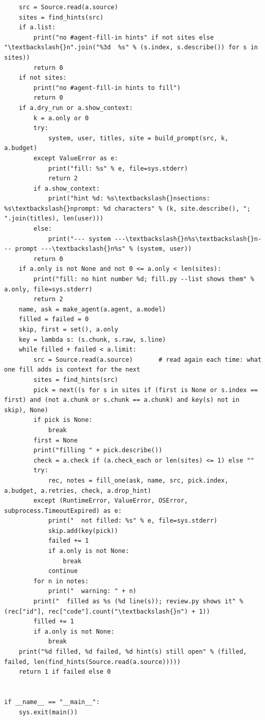 \documentclass[10pt,a4paper]{article}
\newcounter{chunk}
\begin{document}
\begin{Verbatim}
    src = Source.read(a.source)
    sites = find_hints(src)
    if a.list:
        print("no #agent-fill-in hints" if not sites else "\textbackslash{}n".join("%3d  %s" % (s.index, s.describe()) for s in sites))
        return 0
    if not sites:
        print("no #agent-fill-in hints to fill")
        return 0
    if a.dry_run or a.show_context:
        k = a.only or 0
        try:
            system, user, titles, site = build_prompt(src, k, a.budget)
        except ValueError as e:
            print("fill: %s" % e, file=sys.stderr)
            return 2
        if a.show_context:
            print("hint %d: %s\textbackslash{}nsections: %s\textbackslash{}nprompt: %d characters" % (k, site.describe(), "; ".join(titles), len(user)))
        else:
            print("--- system ---\textbackslash{}n%s\textbackslash{}n--- prompt ---\textbackslash{}n%s" % (system, user))
        return 0
    if a.only is not None and not 0 <= a.only < len(sites):
        print("fill: no hint number %d; fill.py --list shows them" % a.only, file=sys.stderr)
        return 2
    name, ask = make_agent(a.agent, a.model)
    filled = failed = 0
    skip, first = set(), a.only
    key = lambda s: (s.chunk, s.raw, s.line)
    while filled + failed < a.limit:
        src = Source.read(a.source)       # read again each time: what one fill adds is context for the next
        sites = find_hints(src)
        pick = next((s for s in sites if (first is None or s.index == first) and (not a.chunk or s.chunk == a.chunk) and key(s) not in skip), None)
        if pick is None:
            break
        first = None
        print("filling " + pick.describe())
        check = a.check if (a.check_each or len(sites) <= 1) else ""
        try:
            rec, notes = fill_one(ask, name, src, pick.index, a.budget, a.retries, check, a.drop_hint)
        except (RuntimeError, ValueError, OSError, subprocess.TimeoutExpired) as e:
            print("  not filled: %s" % e, file=sys.stderr)
            skip.add(key(pick))
            failed += 1
            if a.only is not None:
                break
            continue
        for n in notes:
            print("  warning: " + n)
        print("  filled as %s (%d line(s)); review.py shows it" % (rec["id"], rec["code"].count("\textbackslash{}n") + 1))
        filled += 1
        if a.only is not None:
            break
    print("%d filled, %d failed, %d hint(s) still open" % (filled, failed, len(find_hints(Source.read(a.source)))))
    return 1 if failed else 0


if __name__ == "__main__":
    sys.exit(main())
\end{Verbatim}
\end{document}
